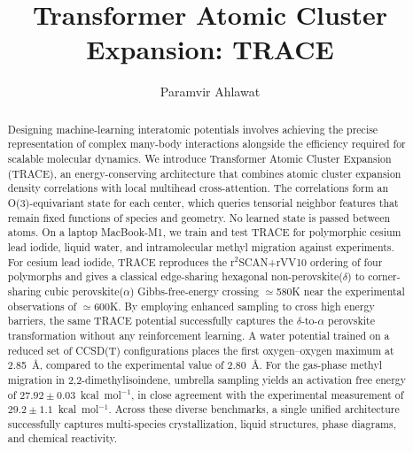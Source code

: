 \documentclass[aps,prx,preprint,notitlepage,superscriptaddress,nofootinbib,floatfix]{revtex4-2}
\begin{document}
\title{Transformer Atomic Cluster Expansion: TRACE}
\author{Paramvir Ahlawat}
\noaffiliation

\begin{abstract}
Designing machine-learning interatomic potentials involves achieving the precise representation of complex many-body interactions alongside the efficiency required for scalable molecular dynamics. We introduce Transformer Atomic Cluster Expansion (TRACE), an energy-conserving architecture that combines atomic cluster expansion density correlations with local multihead cross-attention. The correlations form an O(3)-equivariant state for each center, which queries tensorial neighbor features that remain fixed functions of species and geometry. No learned state is passed between atoms. On a laptop MacBook-M1, we train and test TRACE for polymorphic cesium lead iodide, liquid water, and intramolecular methyl migration against experiments. For cesium lead iodide, TRACE reproduces the r$^2$SCAN+rVV10 ordering of four polymorphs and gives a classical edge-sharing hexagonal non-perovskite($\delta$) to corner-sharing cubic perovskite($\alpha$) Gibbs-free-energy crossing $\simeq$580K near the experimental observations of $\simeq$600K. By employing enhanced sampling to cross high energy barriers, the same TRACE potential successfully captures the $\delta$-to-$\alpha$ perovskite transformation without any reinforcement learning. A water potential trained on a reduced set of CCSD(T) configurations places the first oxygen--oxygen maximum at 2.85~\AA, compared to the experimental value of 2.80~\AA{}. For the gas-phase methyl migration in 2,2-dimethylisoindene, umbrella sampling yields an activation free energy of $27.92\pm0.03$~kcal~mol$^{-1}$, in close agreement with the experimental measurement of $29.2\pm1.1$~kcal~mol$^{-1}$. Across these diverse benchmarks, a single unified architecture successfully captures multi-species crystallization, liquid structures, phase diagrams, and chemical reactivity.
\end{abstract}

\makeatletter
\@booleanfalse\preprintsty@sw
\makeatother
\maketitle
\makeatletter
\@booleantrue\preprintsty@sw
\makeatother
\end{document}
